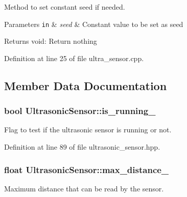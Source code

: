 Method to set constant seed if needed. 


\begin{DoxyParams}[1]{Parameters}
\mbox{\tt in}  & {\em seed} & Constant value to be set as seed\\
\hline
\end{DoxyParams}
\begin{DoxyReturn}{Returns}
void\+: Return nothing 
\end{DoxyReturn}


Definition at line 25 of file ultra\+\_\+sensor.\+cpp.



\subsection{Member Data Documentation}
\subsubsection[{\texorpdfstring{is\+\_\+running\+\_\+}{is_running_}}]{\setlength{\rightskip}{0pt plus 5cm}bool Ultrasonic\+Sensor\+::is\+\_\+running\+\_\+\hspace{0.3cm}{\ttfamily [private]}}\hypertarget{class_ultrasonic_sensor_a7d98b5005d41e9bb8fd84c71dde4079a}{}\label{class_ultrasonic_sensor_a7d98b5005d41e9bb8fd84c71dde4079a}
Flag to test if the ultrasonic sensor is running or not. 

Definition at line 89 of file ultrasonic\+\_\+sensor.\+hpp.

\subsubsection[{\texorpdfstring{max\+\_\+distance\+\_\+}{max_distance_}}]{\setlength{\rightskip}{0pt plus 5cm}float Ultrasonic\+Sensor\+::max\+\_\+distance\+\_\+\hspace{0.3cm}{\ttfamily [private]}}\hypertarget{class_ultrasonic_sensor_a7a41e3e74c23db857fd6cc3728439461}{}\label{class_ultrasonic_sensor_a7a41e3e74c23db857fd6cc3728439461}


Maximum distance that can be read by the sensor. 



